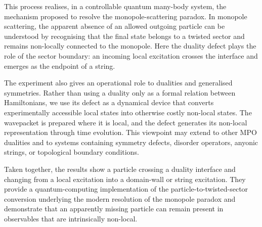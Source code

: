 This process realises, in a controllable quantum many-body system, the mechanism proposed to resolve the monopole-scattering paradox. In monopole scattering, the apparent absence of an allowed outgoing particle can be understood by recognising that the final state belongs to a twisted sector and remains non-locally connected to the monopole. Here the duality defect plays the role of the sector boundary: an incoming local excitation crosses the interface and emerges as the endpoint of a string. 

The experiment also gives an operational role to dualities and generalised symmetries. Rather than using a duality only as a formal relation between Hamiltonians, we use its defect as a dynamical device that converts experimentally accessible local states into otherwise costly non-local states. The wavepacket is prepared where it is local, and the defect generates its non-local representation through time evolution. This viewpoint may extend to other MPO dualities and to systems containing symmetry defects, disorder operators, anyonic strings, or topological boundary conditions.

Taken together, the results show a particle crossing a duality interface and changing from a local excitation into a domain-wall or string excitation. They provide a quantum-computing implementation of the particle-to-twisted-sector conversion underlying the modern resolution of the monopole paradox and demonstrate that an apparently missing particle can remain present in observables that are intrinsically non-local.